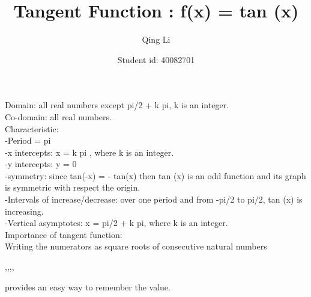 \documentclass[12pt]{extarticle}
\title{Tangent Function : f(x) = tan (x)}
\author{Qing Li}
\date{Student id: 40082701}
\begin{document}
\maketitle



Domain: all real numbers except pi/2 + k pi, k is an integer.\\

Co-domain: all real numbers.\\

Characteristic:\\

-Period = pi\\ 

-x intercepts: x = k pi , where k is an integer.\\ 

-y intercepts: y = 0 \\

-symmetry: since tan(-x) = - tan(x) then tan (x) is an odd function and its graph is symmetric with respect the origin. \\

-Intervals of increase/decrease: over one period and from -pi/2 to pi/2, tan (x) is increasing. \\

-Vertical asymptotes: x = pi/2 + k pi, where k is an integer. \\

Importance of tangent function:\\

Writing the numerators as square roots of consecutive natural numbers

{,{},{},{},{}} 

provides an easy way to remember the value.\\
\end{document}
